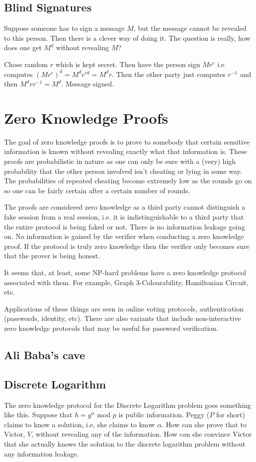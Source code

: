 \documentclass[12pt,a4paper]{article}
\begin{document}
\subsection{Blind Signatures}
Suppose someone has to sign a message $M$, but the message cannot be revealed to this person. Then there is a clever way of doing it. The question is really, how does one get $M^{d}$ without revealing $M$? 

Chose random $r$ which is kept secret. Then have the person sign $Mr^{e}$ i.e computes $(Mr^{e})^{d} = M^{d}r^{rd} = M^{d}r$. Then the other party just computes $r^{-1}$ and then $M^{d}rr^{-1} = M^{d}$. Message signed. 


\section{Zero Knowledge Proofs}
The goal of zero knowledge proofs is to prove to somebody that certain sensitive information is known without revealing exactly what that information is. These proofs are probabilistic in nature as one can only be sure with a (very) high probability that the other person involved isn't cheating or lying in some way. The probabilities of repeated cheating become extremely low as the rounds go on so one can be fairly certain after a certain number of rounds. 

The proofs are considered zero knowledge as a third party cannot distinguish a fake session from a real session, i.e. it is indistinguishable to a third party that the entire protocol is being faked or not. There is no information leakage going on. No information is gained by the verifier when conducting a zero knowledge proof. If the protocol is truly zero knowledge then the verifier only becomes sure that the prover is being honest. 

It seems that, at least, some NP-hard problems have a zero knowledge protocol associated with them. For example, Graph 3-Colourability, Hamiltonian Circuit, etc. 

Applications of these things are seen in online voting protocols, authentication (passwords, identity, etc). There are also variants that include non-interactive zero knowledge protocols that may be useful for password verification. 

\subsection{Ali Baba's cave}
\subsection{Discrete Logarithm}
The zero knowledge protocol for the Discrete Logarithm problem goes something like this. Suppose that $h = g^{\alpha}$ mod $p$ is public information. Peggy ($P$ for short) claims to know a solution, i.e, she claims to know $\alpha$. How can she prove that to Victor, $V$, without revealing any of the information. How can she convince Victor that she actually knows the solution to the discrete logarithm problem without any information leakage. 
\end{document}
